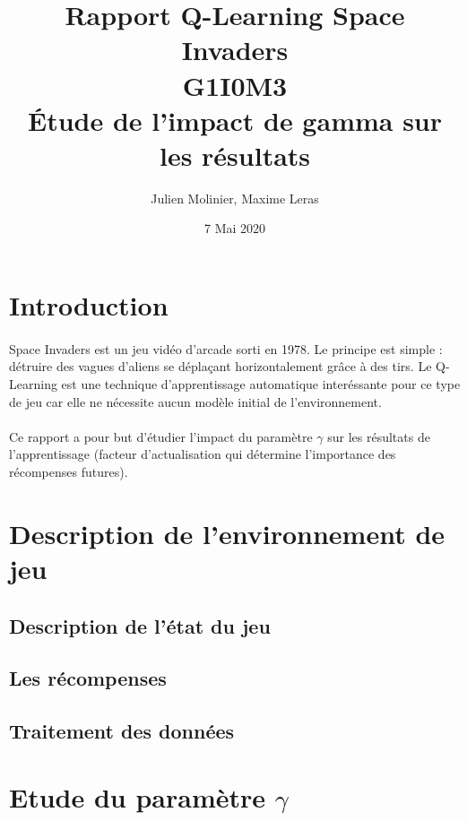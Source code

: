 \documentclass[12pt,oneside,a4paper]{article}
\begin{document}
\title{Rapport Q-Learning Space Invaders \\ G1I0M3 \\ Étude de l'impact de gamma sur les résultats}

\author{Julien Molinier, Maxime Leras}
\date{7 Mai 2020}
\maketitle\thispagestyle{empty}

\newpage    
\clearpage
\thispagestyle{empty}
\renewcommand*\contentsname{Sommaire}
\tableofcontents
\newpage

\pagestyle{fancy}
\cfoot{\thepage}
\fancyhead{}
\fancyhead[R]{\leftmark}

\section{Introduction}
\paragraph{}
    Space Invaders est un jeu vidéo d'arcade sorti en 1978. Le principe
    est simple : détruire des vagues d'aliens se déplaçant horizontalement
    grâce à des tirs.
    Le Q-Learning est une technique d'apprentissage automatique
    interéssante pour ce type de jeu car elle ne nécessite aucun modèle 
    initial de l'environnement.
\paragraph{}
    Ce rapport a pour but d'étudier l'impact du paramètre $\gamma$ sur 
    les résultats de l'apprentissage (facteur d'actualisation qui détermine 
    l'importance des récompenses futures).

\section{Description de l'environnement de jeu}
\subsection{Description de l'état du jeu}
\subsection{Les récompenses}
\subsection{Traitement des données}


\section{Etude du paramètre $\gamma$}
\end{document}
